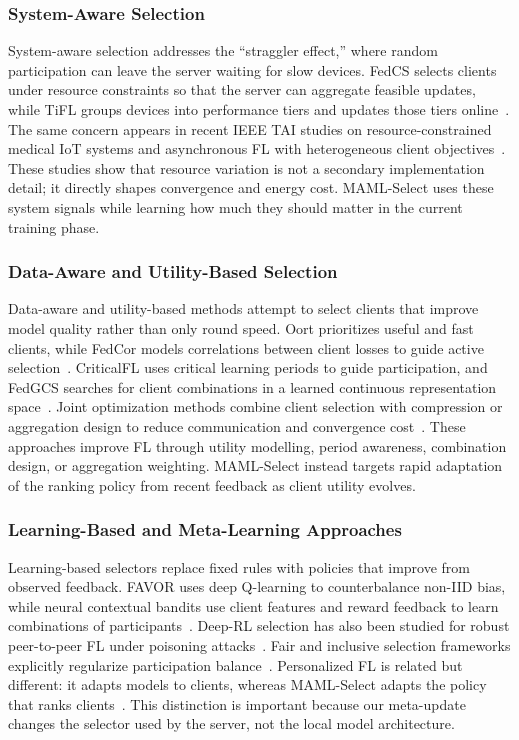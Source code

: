 \documentclass[journal]{IEEEtran}
\begin{document}
\subsubsection{System-Aware Selection}
System-aware selection addresses the ``straggler effect,'' where random participation can leave the server waiting for slow devices. FedCS selects clients under resource constraints so that the server can aggregate feasible updates, while TiFL groups devices into performance tiers and updates those tiers online~\cite{nishio2019client,chai2020tifl}. The same concern appears in recent IEEE TAI studies on resource-constrained medical IoT systems and asynchronous FL with heterogeneous client objectives~\cite{tapwal2026stragglers,forootani2026asynchronous}. These studies show that resource variation is not a secondary implementation detail; it directly shapes convergence and energy cost. MAML-Select uses these system signals while learning how much they should matter in the current training phase.

\subsubsection{Data-Aware and Utility-Based Selection}
Data-aware and utility-based methods attempt to select clients that improve model quality rather than only round speed. Oort prioritizes useful and fast clients, while FedCor models correlations between client losses to guide active selection~\cite{lai2021oort,tang2022fedcor}. CriticalFL uses critical learning periods to guide participation, and FedGCS searches for client combinations in a learned continuous representation space~\cite{yan2023criticalfl,ning2024fedgcs}. Joint optimization methods combine client selection with compression or aggregation design to reduce communication and convergence cost~\cite{xu2024federated,tran2026fedimp}. These approaches improve FL through utility modelling, period awareness, combination design, or aggregation weighting. MAML-Select instead targets rapid adaptation of the ranking policy from recent feedback as client utility evolves.

\subsubsection{Learning-Based and Meta-Learning Approaches}
Learning-based selectors replace fixed rules with policies that improve from observed feedback. FAVOR uses deep Q-learning to counterbalance non-IID bias, while neural contextual bandits use client features and reward feedback to learn combinations of participants~\cite{wang2020optimizing,pan2024contextual}. Deep-RL selection has also been studied for robust peer-to-peer FL under poisoning attacks~\cite{kazemi2026robust}. Fair and inclusive selection frameworks explicitly regularize participation balance~\cite{arisdakessian2026vox}. Personalized FL is related but different: it adapts models to clients, whereas MAML-Select adapts the policy that ranks clients~\cite{fallah2020personalized}. This distinction is important because our meta-update changes the selector used by the server, not the local model architecture.
\end{document}
